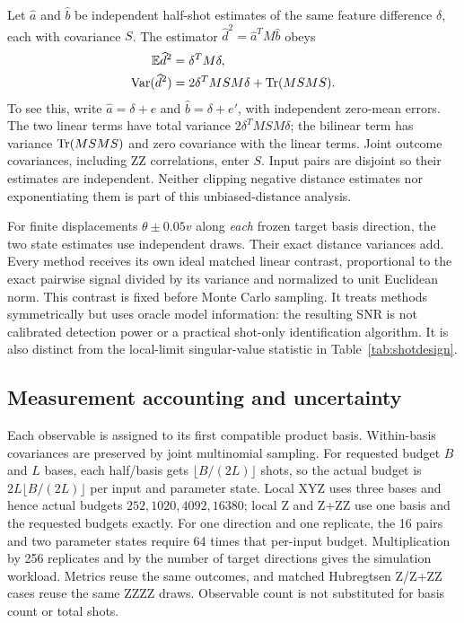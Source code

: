 Let $\widehat a$ and $\widehat b$ be independent half-shot estimates
of the same feature difference $\delta$, each with covariance $S$.
The estimator $\widehat d^2=\widehat a^T M\widehat b$ obeys
\begin{align}
 \mathbb E\widehat d^2&=\delta^TM\delta,\label{eq:splitmean}\\
 \operatorname{Var}(\widehat d^2)
 &=2\delta^TMSM\delta+\operatorname{Tr}(MSMS).\label{eq:splitvariance}
\end{align}
To see this, write $\widehat a=\delta+e$ and
$\widehat b=\delta+e'$, with independent zero-mean errors. The two
linear terms have total variance $2\delta^TMSM\delta$; the bilinear
term has variance $\operatorname{Tr}(MSMS)$ and zero covariance with the linear
terms. Joint outcome covariances, including ZZ correlations, enter
$S$. Input pairs are disjoint so their estimates are independent.
Neither clipping negative distance estimates nor exponentiating
them is part of this unbiased-distance analysis.

For finite displacements $\theta\pm0.05v$ along \emph{each} frozen
target basis direction, the two state estimates use independent
draws. Their exact distance variances add. Every method receives
its own ideal matched linear contrast, proportional to the exact
pairwise signal divided by its variance and normalized to unit
Euclidean norm. This contrast is fixed before Monte Carlo sampling.
It treats methods symmetrically but uses oracle model information:
the resulting SNR is not calibrated detection power or a practical
shot-only identification algorithm. It is also distinct from the
local-limit singular-value statistic in Table~\ref{tab:shotdesign}.

\subsection{Measurement accounting and uncertainty}
Each observable is assigned to its first compatible product basis.
Within-basis covariances are preserved by joint multinomial sampling.
For requested budget $B$ and $L$ bases, each half/basis gets
$\lfloor B/(2L)\rfloor$ shots, so the actual budget is
$2L\lfloor B/(2L)\rfloor$ per input and parameter state. Local XYZ
uses three bases and hence actual budgets $252,1020,4092,16380$;
local Z and Z+ZZ use one basis and the requested budgets exactly.
For one direction and one replicate, the 16 pairs and two parameter
states require 64 times that per-input budget. Multiplication by
256 replicates and by the number of target directions gives the
simulation workload. Metrics reuse the same outcomes, and matched
Hubregtsen Z/Z+ZZ cases reuse the same ZZZZ draws. Observable count
is not substituted for basis count or total shots.

